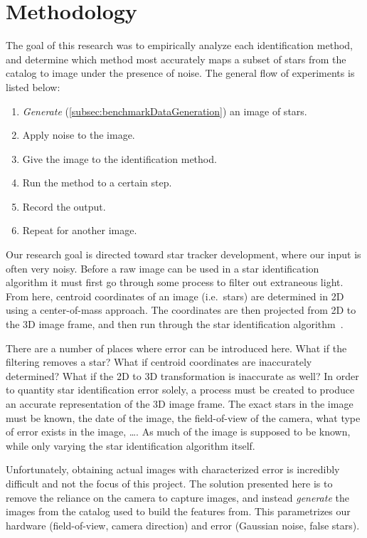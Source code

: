 \newcommand{\itmref}[2]{\hyperref[#2]{#1 Variable~\ref*{#2}}}

\section{Methodology}\label{sec:methodology}
The goal of this research was to empirically analyze each identification method, and determine which method most
accurately maps a subset of stars from the catalog to image under the presence of noise.
The general flow of experiments is listed below:
\begin{enumerate}
    \item \textit{Generate} (\autoref{subsec:benchmarkDataGeneration}) an image of stars.
    \item Apply noise to the image.
    \item Give the image to the identification method.
    \item Run the method to a certain step.
    \item Record the output.
    \item Repeat for another image.
\end{enumerate}

Our research goal is directed toward star tracker development, where our input is often very noisy.
Before a raw image can be used in a star identification algorithm it must first go through some process to filter out
extraneous light.
From here, centroid coordinates of an image (i.e.\ stars) are determined in 2D using a center-of-mass approach.
The coordinates are then projected from 2D to the 3D image frame, and then run through the star identification
algorithm~\cite{Survey}.

There are a number of places where error can be introduced here.
What if the filtering removes a star?
What if centroid coordinates are inaccurately determined?
What if the 2D to 3D transformation is inaccurate as well?
In order to quantity star identification error solely, a process must be created to produce an accurate
representation of the 3D image frame.
The exact stars in the image must be known, the date of the image, the field-of-view of the camera, what type of
error exists in the image, \ldots.
As much of the image is supposed to be known, while only varying the star identification algorithm itself.

Unfortunately, obtaining actual images with characterized error is incredibly difficult and not the focus of this
project.
The solution presented here is to remove the reliance on the camera to capture images, and instead
\textit{generate} the images from the catalog used to build the features from.
This parametrizes our hardware (field-of-view, camera direction) and error (Gaussian noise, false stars).


